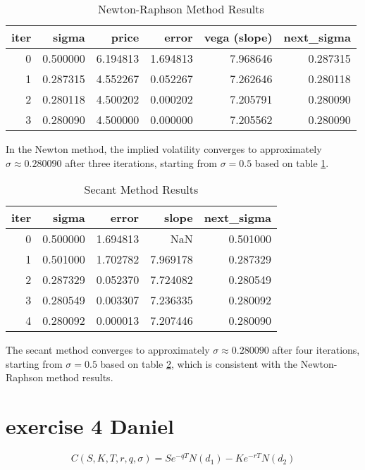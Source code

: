 \documentclass{article}
\begin{document}
\begin{table}
    \centering
    \caption{Newton-Raphson Method Results}
    \label{tab:newton_results}
    \begin{tabular}{rrrrrr}
        \toprule
        iter & sigma    & price    & error    & vega (slope) & next\_sigma \\
        \midrule
        0    & 0.500000 & 6.194813 & 1.694813 & 7.968646     & 0.287315    \\
        1    & 0.287315 & 4.552267 & 0.052267 & 7.262646     & 0.280118    \\
        2    & 0.280118 & 4.500202 & 0.000202 & 7.205791     & 0.280090    \\
        3    & 0.280090 & 4.500000 & 0.000000 & 7.205562     & 0.280090    \\
        \bottomrule
    \end{tabular}
\end{table}

In the Newton method, the implied volatility converges to approximately \( \sigma \approx 0.280090 \)
after three iterations, starting from \( \sigma = 0.5 \) based on table \ref{tab:newton_results}.

\begin{table}
    \centering
    \caption{Secant Method Results}
    \label{tab:secant_results}
    \begin{tabular}{rrrrr}
        \toprule
        iter & sigma    & error    & slope    & next\_sigma \\
        \midrule
        0    & 0.500000 & 1.694813 & NaN      & 0.501000    \\
        1    & 0.501000 & 1.702782 & 7.969178 & 0.287329    \\
        2    & 0.287329 & 0.052370 & 7.724082 & 0.280549    \\
        3    & 0.280549 & 0.003307 & 7.236335 & 0.280092    \\
        4    & 0.280092 & 0.000013 & 7.207446 & 0.280090    \\
        \bottomrule
    \end{tabular}
\end{table}
The secant method converges to approximately \( \sigma \approx 0.280090 \)
after four iterations, starting from \( \sigma = 0.5 \) based on table \ref{tab:secant_results},
which is consistent with the Newton-Raphson method results.

\section{exercise 4 Daniel}
\[
    C(S, K, T, r, q, \sigma) = S e^{-qT} N(d_1) - K e^{-rT} N(d_2)
\]
\end{document}
